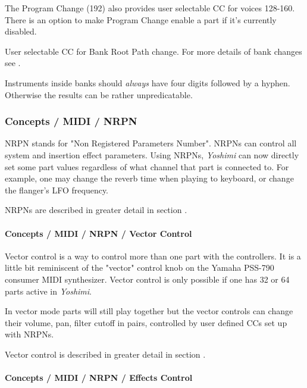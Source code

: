    The Program Change (192) also provides user selectable CC for voices
   128-160.  There is an option to make Program Change enable a part if it's
   currently disabled.

   User selectable CC for Bank Root Path change.
   For more details of bank changes see
   .

   Instruments inside banks should \textsl{always} have four digits followed
   by a hyphen. Otherwise the results can be rather unpredicatable.

\subsubsection{Concepts / MIDI / NRPN}
\label{subsubsec:concepts_midi_nrpn}

   NRPN stands for "Non Registered Parameters Number".
   NRPNs can control all system and insertion effect parameters.
   Using NRPNs, \textsl{Yoshimi} can now directly set some part values
   regardless of what channel that part is connected to.  For example, one
   may change the reverb time when playing to keyboard, or
   change the flanger's LFO frequency.

   NRPNs are described in greater detail in section
   .

\paragraph{Concepts / MIDI / NRPN / Vector Control}
\label{paragraph:concepts_midi_nrpn_vector_control}

   Vector control is a way to control more than one part with the
   controllers.
   It is a little bit reminiscent of the "vector" control knob on the 
   Yamaha PSS-790 consumer MIDI synthesizer.
   Vector control is only possible if one has 32 or 64 parts active 
   in \textsl{Yoshimi}.

   In vector mode parts will still play together but the vector controls can
   change their volume, pan, filter cutoff in pairs, controlled by user
   defined CCs set up with NRPNs.

   Vector control is described in greater detail in section
   .

\paragraph{Concepts / MIDI / NRPN / Effects Control}
\label{paragraph:concepts_midi_nrpn_effects_control}

